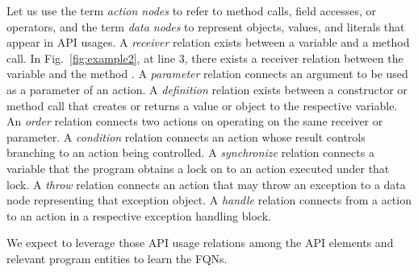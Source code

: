 Let us use the term {\em action nodes} to refer to method calls, field
accesses, or operators, and the term {\em data nodes} to represent
objects, values, and literals that appear in API usages. A {\em
  receiver} relation exists between a variable and a method call. In
Fig.~\ref{fig:example2}, at line 3, there exists a receiver relation
between the variable  and the method
. A {\em parameter} relation connects an
argument to be used as a parameter of an action. A {\em definition}
relation exists between a constructor or method call that creates or
returns a value or object to the respective variable. An {\em order}
relation connects two actions on operating on the same receiver or
parameter. A {\em condition} relation connects an action whose result
controls branching to an action being controlled. A {\em synchronize}
relation connects a variable that the program obtains a lock on to an
action executed under that lock. A {\em throw} relation connects an
action that may throw an exception to a data node representing that
exception object. A {\em handle} relation connects from a 
action to an action in a respective exception handling block.

We expect to leverage those API usage relations among the API elements
and relevant program entities to learn the FQNs.



